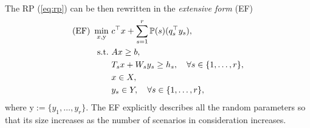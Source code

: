 The RP (\ref{eq:rp}) can be then rewritten in the \textit{extensive form} (EF)
\begin{subequations}\label{sip:ef}
\begin{align}
\textrm{(EF) }\min_{x,\mathrm{y}}\ &c^{\top}x + \sum_{s=1}^{r}\operatorname*{\mathbb{P}}(s) (q_s^{\top}y_s), \label{ef:obj}\\ 
\mathrm{s.t.}\ &Ax\ge b,  \label{ef:b}\\
	&T_s x+W_s y_s\ge h_s,\quad\forall s\in\{1,\ldots,r\}, \label{ef:c} \\
	&x\in X, \label{ef:d} \\
	&y_s \in Y,\quad\forall s\in\{1,\ldots,r\}, \label{ef:e}
\end{align}
\end{subequations}
where $\mathrm{y}:=\{y_1,\ldots,y_r\}$. The EF explicitly describes all the random parameters so that its size increases as the number of scenarios in consideration increases.
